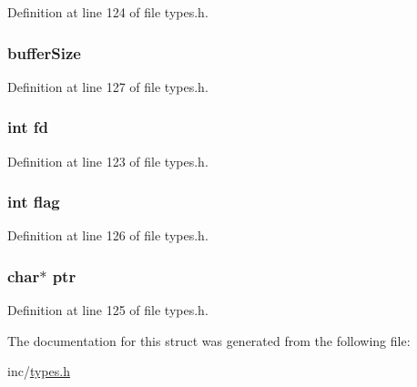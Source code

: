 Definition at line 124 of file types.h.

\hypertarget{struct_f_i_l_e_a7be887a2ca0a258cf6b368d32fd87487}{
\subsubsection[{bufferSize}]{ {\bf bufferSize}}}
\label{struct_f_i_l_e_a7be887a2ca0a258cf6b368d32fd87487}


Definition at line 127 of file types.h.

\hypertarget{struct_f_i_l_e_a6f8059414f0228f0256115e024eeed4b}{
\subsubsection[{fd}]{\setlength{\rightskip}{0pt plus 5cm}int {\bf fd}}}
\label{struct_f_i_l_e_a6f8059414f0228f0256115e024eeed4b}


Definition at line 123 of file types.h.

\hypertarget{struct_f_i_l_e_adf916204820072417ed73a32de1cefcf}{
\subsubsection[{flag}]{\setlength{\rightskip}{0pt plus 5cm}int {\bf flag}}}
\label{struct_f_i_l_e_adf916204820072417ed73a32de1cefcf}


Definition at line 126 of file types.h.

\hypertarget{struct_f_i_l_e_a935adc2e417a61d7eb6f04efb18ba031}{
\subsubsection[{ptr}]{\setlength{\rightskip}{0pt plus 5cm}char$\ast$ {\bf ptr}}}
\label{struct_f_i_l_e_a935adc2e417a61d7eb6f04efb18ba031}


Definition at line 125 of file types.h.



The documentation for this struct was generated from the following file:\begin{DoxyCompactItemize}
\item 
inc/\hyperlink{types_8h}{types.h}\end{DoxyCompactItemize}
